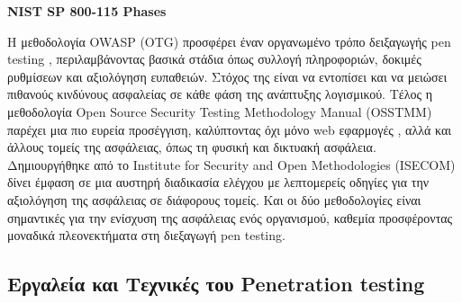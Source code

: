 \begin{center}
    \textbf{\lt NIST SP 800-115 Phases}
\end{center}


Η μεθοδολογία \lt OWASP (OTG) \gt προσφέρει έναν οργανωμένο τρόπο δειξαγωγής \lt pen testing \gt, περιλαμβάνοντας βασικά στάδια όπως  συλλογή πληροφοριών, δοκιμές ρυθμίσεων και  αξιολόγηση ευπαθειών. Στόχος της είναι να εντοπίσει και να μειώσει πιθανούς κινδύνους ασφαλείας σε κάθε φάση της ανάπτυξης λογισμικού. Τέλος η μεθοδολογία \lt Open Source Security Testing Methodology Manual (OSSTMM) \gt παρέχει μια πιο ευρεία προσέγγιση, καλύπτοντας όχι μόνο web εφαρμογές , αλλά και άλλους τομείς της ασφάλειας, όπως τη φυσική και δικτυακή ασφάλεια. Δημιουργήθηκε από το \lt Institute for Security and Open Methodologies (ISECOM)  δίνει έμφαση σε μια αυστηρή διαδικασία ελέγχου με λεπτομερείς οδηγίες για την αξιολόγηση της ασφάλειας σε διάφορους τομείς. Και οι δύο μεθοδολογίες είναι σημαντικές για την ενίσχυση της ασφάλειας ενός οργανισμού, καθεμία προσφέροντας μοναδικά πλεονεκτήματα στη διεξαγωγή \lt pen testing.
\subsection{\gt Εργαλεία και Τεχνικές του \lt Penetration testing}
